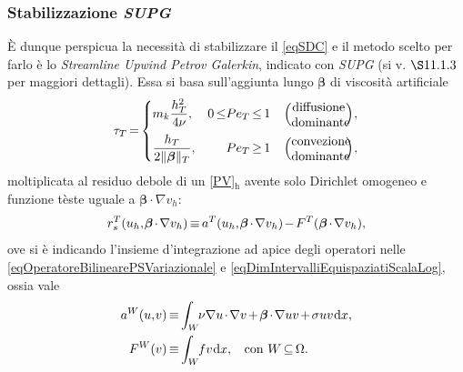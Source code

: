\documentclass{article}
\newcommand{\de}{\mathrm{d}}
\newcommand{\SpaziaturaMate}[3]{
    \setlength{\thinmuskip}{#1mu}
    \setlength{\medmuskip}{#2mu}
    \setlength{\thickmuskip}{#3mu}
}
\newcommand{\teqref}[2]{\hyperref[#1]{#2}}
\begin{document}
    
            \subsubsection{Stabilizzazione \texorpdfstring{\textit{SUPG}}{SUPG}}

                È dunque perspicua la necessità di stabilizzare il \eqref{eqSDC} e il metodo scelto per farlo è lo \textit{Streamline Upwind Petrov Galerkin}, indicato con \textit{SUPG} (si v. \cite{dispenseMEDèPA} $\S11.1.3$ per maggiori dettagli). Essa si basa sull'aggiunta lungo $\boldsymbol\beta$ di viscosità artificiale
                \begin{equation}
                    \SpaziaturaMate{1}{2}{3}
                    \tau_T=
                    \left\{
                    \begin{aligned} 
                        &m_k\frac{h_T^2}{4\nu},
                        &0\le &Pe_T\le1\quad
                        \left(\parbox[c]{1.5cm}{\centering diffusione\\dominante}\right),\\[2.5pt]
                        &\frac{h_T}{2\Vert\boldsymbol\beta\Vert_T},
                        &&Pe_T\ge 1\quad
                        \left(\parbox[c]{1.5cm}{\centering convezione\\dominante}\right),
                    \end{aligned}
                    \right.
                    \label{eqViscositaArtificiale}
                \end{equation}
                moltiplicata al residuo debole di un \teqref{eqPSVariazionaleDiscreto}{[PV]$_\text{h}$} avente solo Dirichlet omogeneo e funzione tèste uguale a $\boldsymbol\beta\cdot\nabla v_h$:
                \begin{equation*}
                    \SpaziaturaMate{1}{2}{3}
                    r_s^T(u_h,\boldsymbol\beta\cdot\nabla v_h)\equiv a^T(u_h,\boldsymbol\beta\cdot\nabla v_h)-F^T(\boldsymbol\beta\cdot\nabla v_h),
                    \label{eqResiduoPEDiscreto}
                \end{equation*}
                ove si è indicando l'insieme d'integrazione ad apice degli operatori nelle \eqref{eqOperatoreBilinearePSVariazionale} e \eqref{eqDimIntervalliEquispaziatiScalaLog}, ossia vale
                \begin{equation*}
                    \SpaziaturaMate{1}{2}{3}
                    \begin{aligned}
                        a^W(u,v)&\equiv
                        \int_W\!\!\!\nu\nabla u\cdot\nabla v
                        +\boldsymbol\beta\cdot\nabla uv
                        +\sigma uv \,\de x,\\
                        F^W(v)&\equiv
                        \int_W\!\!\!fv\, \de x,
                        \quad\text{con }W\subseteq\Omega.
                    \end{aligned}
                    \label{eqOperatoreBilinearePVRidefinizioneSottoinsieme}
                \end{equation*}
\end{document}
